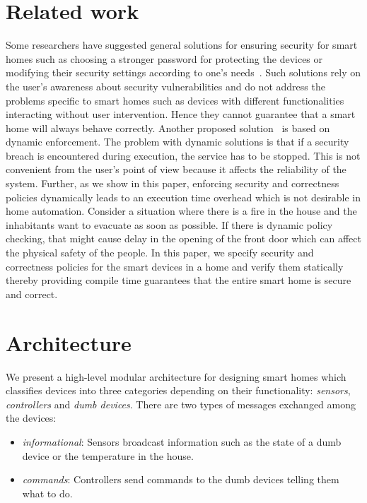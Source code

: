 \documentclass{article}
\begin{document}
\section{Related work}
Some researchers have suggested general solutions for ensuring security for smart homes such as choosing a stronger password for protecting the devices or modifying their security settings according to one's needs~\cite{semantec}. Such solutions rely on the user's awareness about security vulnerabilities and do not address the problems specific to smart homes such as devices with different functionalities interacting without user intervention. Hence they cannot guarantee that a smart home will always behave correctly. Another proposed solution~\cite{al2000secure} is based on dynamic enforcement. The problem with dynamic solutions is that if a security breach is encountered during execution, the service has to be stopped. This is not convenient from the user's point of view because it affects the reliability of the system. Further, as we show in this paper, enforcing security and correctness policies dynamically leads to an execution time overhead which is not desirable in home automation. Consider a situation where there is a fire in the house and the inhabitants want to evacuate as soon as possible. If there is dynamic policy checking, that might cause delay in the opening of the front door which can affect the physical safety of the people. 
In this paper, we specify security and correctness policies for the smart devices in a home and verify them statically thereby providing compile time guarantees that the entire smart home is secure and correct.

\section{Architecture}
\label{sec:archi}
We present a high-level modular architecture for designing smart homes which classifies devices into three categories depending on their functionality: \textit{sensors}, \textit{controllers} and \textit{dumb devices}. There are two types of messages exchanged among the devices: 
\begin{itemize}[topsep=0pt,itemsep=-1ex,partopsep=1ex,parsep=1ex]
    \item \textit{informational}: Sensors broadcast information such as the state of a dumb device or the temperature in the house.  
    \item \textit{commands}: Controllers send commands to the dumb devices telling them what to do.
\end{itemize}
\end{document}
